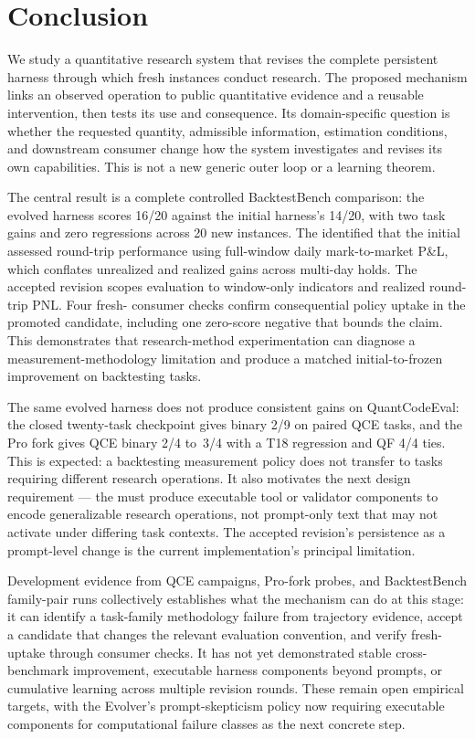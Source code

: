 \section{Conclusion}

We study a quantitative research system that revises the complete persistent
harness through which fresh \Worker{} instances conduct research.  The proposed
mechanism links an observed operation to public quantitative evidence and a
reusable intervention, then tests its use and consequence.  Its domain-specific
question is whether the requested quantity, admissible information, estimation
conditions, and downstream consumer change how the system investigates and
revises its own capabilities.  This is not a new generic outer loop or a
learning theorem.

The central result is a complete controlled BacktestBench comparison: the
evolved harness scores 16/20 against the initial harness's 14/20, with two task
gains and zero regressions across 20 new instances.  The \Evolver{} identified
that the initial \Worker{} assessed round-trip performance using full-window
daily mark-to-market P\&L, which conflates unrealized and realized gains across
multi-day holds.  The accepted revision scopes evaluation to window-only
indicators and realized round-trip PNL.  Four fresh-\Worker{} consumer checks
confirm consequential policy uptake in the promoted candidate, including one
zero-score negative that bounds the claim.  This demonstrates that
research-method experimentation can diagnose a measurement-methodology
limitation and produce a matched initial-to-frozen improvement on backtesting
tasks.

The same evolved harness does not produce consistent gains on QuantCodeEval:
the closed twenty-task checkpoint gives binary 2/9 on paired QCE tasks, and the
Pro \Evolver{} fork gives QCE binary 2/4 to~3/4 with a T18 regression and QF
4/4 ties.  This is expected: a backtesting measurement policy does not transfer
to tasks requiring different research operations.  It also motivates the next
design requirement --- the \Evolver{} must produce executable tool or validator
components to encode generalizable research operations, not prompt-only text
that may not activate under differing task contexts.  The accepted revision's
persistence as a prompt-level change is the current implementation's principal
limitation.

Development evidence from QCE campaigns, Pro-fork probes, and BacktestBench
family-pair runs collectively establishes what the mechanism can do at this
stage: it can identify a task-family methodology failure from trajectory
evidence, accept a candidate that changes the relevant evaluation convention,
and verify fresh-\Worker{} uptake through consumer checks.  It has not yet
demonstrated stable cross-benchmark improvement, executable harness components
beyond prompts, or cumulative learning across multiple revision rounds.  These
remain open empirical targets, with the Evolver's prompt-skepticism policy now
requiring executable components for computational failure classes as the next
concrete step.
